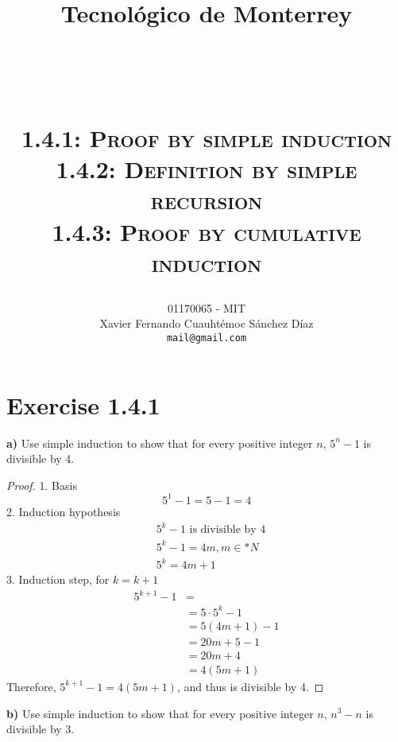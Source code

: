 \documentclass[titlepage, letterpaper, fleqn]{article}
\title{
\vspace{1in}
\textbf{Tecnológico de Monterrey} \\
\vspace{0.5in}
\textmd{\mahclass} \\
\large{\textit{\mahteacher}} \\
\vspace{0.5in}
\textsc{\mahtitle}\\
\textsc{1.4.1: Proof by simple induction}\\
\textsc{1.4.2: Definition by simple recursion}\\
\textsc{1.4.3: Proof by cumulative induction}\\
\author{01170065  - MIT \\
Xavier Fernando Cuauhtémoc Sánchez Díaz \\
\texttt{mail@gmail.com}}
\date{\mahdate}
}
\newcommand{\spacepls}{\vspace{5mm}}
\begin{document}
\begin{titlepage}
\maketitle
\end{titlepage}

%
%

\section{Exercise 1.4.1}

{\large \textbf{a)} Use simple induction to show that for every positive integer \(n\), \(5^n - 1\) is divisible by 4.}

\begin{proof}
1. Basis \\
\[5 ^1 - 1 = 5 - 1 = 4 \tag*{n = 1}\]
2. Induction hypothesis \\
\begin{align*}
& 5^k - 1 \text{ is divisible by 4} \tag*{n=k}\\
& 5^k - 1 = 4m, m \in \mathbb*{N}\\
& 5^k = 4m + 1 \tag*{arithmetic}
\end{align*}
3. Induction step, for \(k = k+1\) \\
\begin{align*}
5^{k+1} - 1 & = \\
& = 5 \cdot 5^k - 1 \\
& = 5(4m + 1) - 1 \tag*{substitution with hypothesis}\\
& = 20m + 5 - 1\\
& = 20m + 4\\
& = 4(5m+1)
\end{align*}
Therefore, \(5^{k+1}-1 = 4(5m+1)\), and thus is divisible by 4.
\end{proof}

\spacepls

{\large \textbf{b)} Use simple induction to show that for every positive integer \(n\), \(n^3 - n\) is divisible by 3.}
\end{document}
